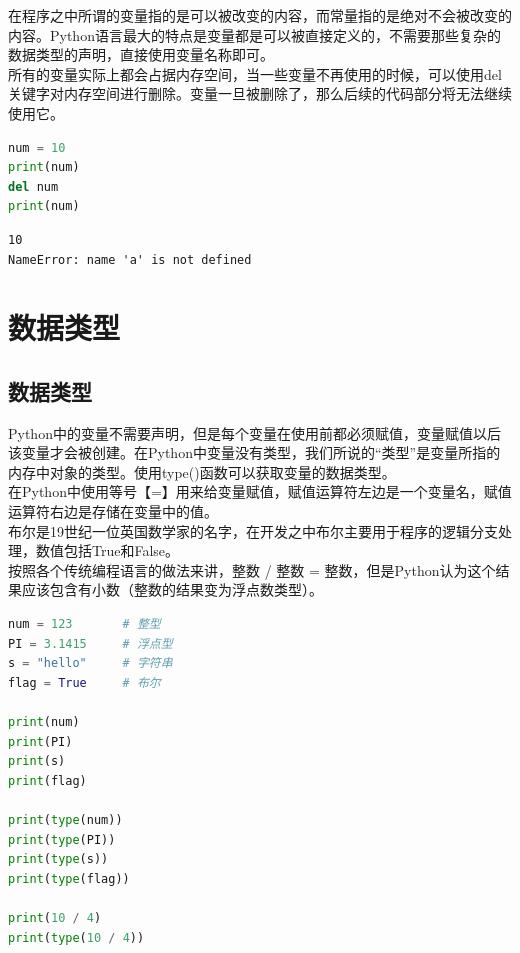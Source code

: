 在程序之中所谓的变量指的是可以被改变的内容，而常量指的是绝对不会被改变的内容。Python语言最大的特点是变量都是可以被直接定义的，不需要那些复杂的数据类型的声明，直接使用变量名称即可。\\

所有的变量实际上都会占据内存空间，当一些变量不再使用的时候，可以使用del关键字对内存空间进行删除。变量一旦被删除了，那么后续的代码部分将无法继续使用它。\\


\begin{lstlisting}[language=Python]
num = 10
print(num)
del num
print(num)
\end{lstlisting}

\begin{tcolorbox}
	\begin{verbatim}
10
NameError: name 'a' is not defined
\end{verbatim}
\end{tcolorbox}

\newpage

\section{数据类型}

\subsection{数据类型}

Python中的变量不需要声明，但是每个变量在使用前都必须赋值，变量赋值以后该变量才会被创建。在Python中变量没有类型，我们所说的“类型”是变量所指的内存中对象的类型。使用type()函数可以获取变量的数据类型。\\

在Python中使用等号【=】用来给变量赋值，赋值运算符左边是一个变量名，赋值运算符右边是存储在变量中的值。\\

布尔是19世纪一位英国数学家的名字，在开发之中布尔主要用于程序的逻辑分支处理，数值包括True和False。\\

按照各个传统编程语言的做法来讲，整数 / 整数 = 整数，但是Python认为这个结果应该包含有小数（整数的结果变为浮点数类型）。\\


\begin{lstlisting}[language=Python]
num = 123		# 整型
PI = 3.1415		# 浮点型
s = "hello"		# 字符串
flag = True		# 布尔

print(num)
print(PI)
print(s)
print(flag)

print(type(num))
print(type(PI))
print(type(s))
print(type(flag))

print(10 / 4)
print(type(10 / 4))
\end{lstlisting}

